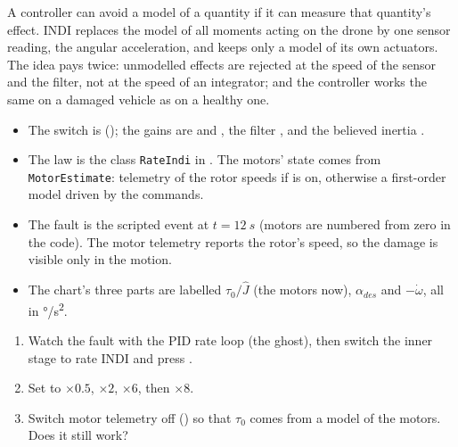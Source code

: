 \begin{keyidea}
A controller can avoid a model of a quantity if it can measure that quantity's effect. INDI replaces the model of all moments acting on the drone by one sensor reading, the angular acceleration, and keeps only a model of its own actuators. The idea pays twice: unmodelled effects are rejected at the speed of the sensor and the filter, not at the speed of an integrator; and the controller works the same on a damaged vehicle as on a healthy one.
\end{keyidea}


\begin{inapp}
\begin{itemize}[leftmargin=1.2em]
  \item The switch is  (); the gains are  and , the filter , and the believed inertia .
  \item The law is the class \texttt{RateIndi} in . The motors' state comes from \texttt{MotorEstimate}: telemetry of the rotor speeds if  is on, otherwise a first-order model driven by the commands.
  \item The fault is the scripted event  at $t = \SI{12}{s}$ (motors are numbered from zero in the code). The motor telemetry reports the rotor's speed, so the damage is visible only in the motion.
  \item The chart's three parts are labelled $\tau_0/\hat J$ (the motors now), $\alpha_{des}$ and $-\dot\omega$, all in \si{\degree/s^2}.
\end{itemize}
\end{inapp}

\begin{trythis}
\begin{enumerate}
  \item Watch the fault with the PID rate loop (the ghost), then switch the inner stage to rate INDI and press .
  \item Set  to $\times0.5$, $\times2$, $\times6$, then $\times8$.
  \item Switch motor telemetry off () so that $\tau_0$ comes from a model of the motors. Does it still work?
\end{enumerate}
\end{trythis}

